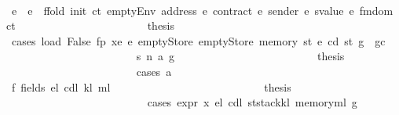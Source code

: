 \begin{isabellebody}
\ \ \ \ \ \ \ \ \ \ \ \ \ \ \ \ \ \ \ \ \isamarkupfalse%
\ e{\isacharprime}{\kern0pt}\ \ {\isachardoublequoteopen}e{\isacharprime}{\kern0pt}\ {\isacharequal}{\kern0pt}\ ffold\ {\isacharparenleft}{\kern0pt}init\ ct{\isacharparenright}{\kern0pt}\ {\isacharparenleft}{\kern0pt}emptyEnv\ {\isacharparenleft}{\kern0pt}address\ e{\isacharparenright}{\kern0pt}\ {\isacharparenleft}{\kern0pt}contract\ e{\isacharparenright}{\kern0pt}\ {\isacharparenleft}{\kern0pt}sender\ e{\isacharparenright}{\kern0pt}\ {\isacharparenleft}{\kern0pt}svalue\ e{\isacharparenright}{\kern0pt}{\isacharparenright}{\kern0pt}\ {\isacharparenleft}{\kern0pt}fmdom\ ct{\isacharparenright}{\kern0pt}{\isachardoublequoteclose}\isanewline
\ \ \ \ \ \ \ \ \ \ \ \ \ \ \ \ \ \ \ \ \isamarkupfalse%
\ \isamarkupfalse%
\ {\isacharquery}{\kern0pt}thesis\isanewline
\ \ \ \ \ \ \ \ \ \ \ \ \ \ \ \ \ \ \ \ \isamarkupfalse%
\ {\isacharparenleft}{\kern0pt}cases\ {\isachardoublequoteopen}load\ False\ fp\ xe\ e{\isacharprime}{\kern0pt}\ emptyStore\ emptyStore\ {\isacharparenleft}{\kern0pt}memory\ st{\isacharparenright}{\kern0pt}\ e\ cd\ st\ {\isacharparenleft}{\kern0pt}g\ {\isacharminus}{\kern0pt}\ gc{\isacharparenright}{\kern0pt}{\isachardoublequoteclose}{\isacharparenright}{\kern0pt}\isanewline
\ \ \ \ \ \ \ \ \ \ \ \ \ \ \ \ \ \ \ \ \ \ \isamarkupfalse%
\ s{}{\isacharcolon}{\kern0pt}\ {\isacharparenleft}{\kern0pt}n\ a\ g{\isacharprime}{\kern0pt}{\isacharparenright}{\kern0pt}\isanewline
\ \ \ \ \ \ \ \ \ \ \ \ \ \ \ \ \ \ \ \ \ \ \isamarkupfalse%
\ \isamarkupfalse%
\ {\isacharquery}{\kern0pt}thesis\isanewline
\ \ \ \ \ \ \ \ \ \ \ \ \ \ \ \ \ \ \ \ \ \ \isamarkupfalse%
\ {\isacharparenleft}{\kern0pt}cases\ a{\isacharparenright}{\kern0pt}\isanewline
\ \ \ \ \ \ \ \ \ \ \ \ \ \ \ \ \ \ \ \ \ \ \ \ \isamarkupfalse%
\ f{}{\isacharcolon}{\kern0pt}\ {\isacharparenleft}{\kern0pt}fields\ e\isactrlsub l\ cd\isactrlsub l\ k\isactrlsub l\ m\isactrlsub l{\isacharparenright}{\kern0pt}\isanewline
\ \ \ \ \ \ \ \ \ \ \ \ \ \ \ \ \ \ \ \ \ \ \ \ \isamarkupfalse%
\ \isamarkupfalse%
\ {\isacharquery}{\kern0pt}thesis\isanewline
\ \ \ \ \ \ \ \ \ \ \ \ \ \ \ \ \ \ \ \ \ \ \ \ \isamarkupfalse%
\ {\isacharparenleft}{\kern0pt}cases\ {\isachardoublequoteopen}expr\ x\ e\isactrlsub l\ cd\isactrlsub l\ {\isacharparenleft}{\kern0pt}st{\isasymlparr}stack{\isacharcolon}{\kern0pt}{\isacharequal}{\kern0pt}k\isactrlsub l{\isacharcomma}{\kern0pt}\ memory{\isacharcolon}{\kern0pt}{\isacharequal}{\kern0pt}m\isactrlsub l{\isasymrparr}{\isacharparenright}{\kern0pt}\ g{\isacharprime}{\kern0pt}{\isachardoublequoteclose}{\isacharparenright}{\kern0pt}\isanewline

\end{isabellebody}
